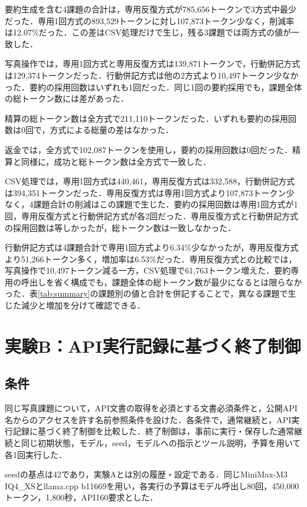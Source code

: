 \documentclass[letter]{ieicej}
\begin{document}
\SummaryResultsTable

要約生成を含む4課題の合計は，専用反復方式が785,656トークンで3方式中最少だった．専用1回方式の893,529トークンに対し107,873トークン少なく，削減率は12.07\%だった．この差はCSV処理だけで生じ，残る3課題では両方式の値が一致した．

写真操作では，専用1回方式と専用反復方式は139,871トークンで，行動併記方式は129,374トークンだった．行動併記方式は他の2方式より10,497トークン少なかった．要約の採用回数はいずれも1回だった．同じ1回の要約採用でも，課題全体の総トークン数には差があった．

精算の総トークン数は全方式で211,110トークンだった．いずれも要約の採用回数は0回で，方式による総量の差はなかった．

返金では，全方式で102,087トークンを使用し，要約の採用回数は0回だった．精算と同様に，成功と総トークン数は全方式で一致した．

CSV処理では，専用1回方式は440,461，専用反復方式は332,588，行動併記方式は394,351トークンだった．専用反復方式は専用1回方式より107,873トークン少なく，4課題合計の削減はこの課題で生じた．要約の採用回数は専用1回方式が1回，専用反復方式と行動併記方式が各2回だった．専用反復方式と行動併記方式の採用回数は等しかったが，総トークン数は一致しなかった．

行動併記方式は4課題合計で専用1回方式より6.34\%少なかったが，専用反復方式より51,266トークン多く，増加率は6.53\%だった．専用反復方式との比較では，写真操作で10,497トークン減る一方，CSV処理で61,763トークン増えた．要約専用の呼出しを省く構成でも，課題全体の総トークン数が最少になるとは限らなかった．表\ref{tab:summary}の課題別の値と合計を併記することで，異なる課題で生じた減少と増加を分けて確認できる．

\section{実験B：API実行記録に基づく終了制御}

\subsection{条件}

同じ写真課題について，API文書の取得を必須とする文書必須条件と，公開API名からのアクセスを許す名前参照条件を設けた．各条件で，通常継続と，API実行記録に基づく終了制御を比較した．終了制御は，事前に実行・保存した通常継続と同じ初期状態，モデル，seed，モデルへの指示とツール説明，予算を用いて各1回実行した．

seedの基点は42であり，実験Aとは別の履歴・設定である．同じMiniMax-M3 IQ4\_XSとllama.cpp b11669を用い，各実行の予算はモデル呼出し80回，450,000トークン，1,800秒，API160要求とした．
\end{document}
